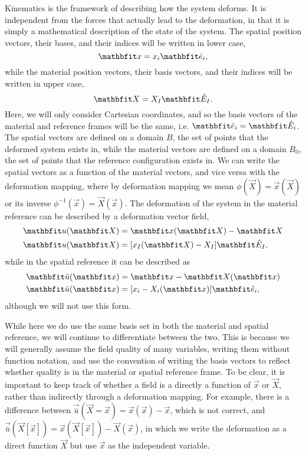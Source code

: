 Kinematics is the framework of describing how the system deforms.
It is independent from the forces that actually lead to the deformation, in that it is simply a mathematical description of the state of the system.
The spatial position vectors, their bases, and their indices will be written in lower case,
\begin{equation}
    \vec{x} = x_{i} \unitvec_{i},
\end{equation}
while the material position vectors, their basis vectors, and their indices will be written in upper case,
\begin{equation}
    \vec{X} = X_{I} \Unitvec_{I}.
\end{equation}
Here, we will only consider Cartesian coordinates, and so the basis vectors of the material and reference frames will be the same, i.e. $\unitvec_{i} = \Unitvec_{i}$.
The spatial vectors are defined on a domain $B$, the set of points that the deformed system exists in, while the material vectors are defined on a domain $B_{0}$, the set of points that the reference configuration exists in.
We can write the spatial vectors as a function of the material vectors, and vice versa with the deformation mapping, where by deformation mapping we mean $\phi(\vec{X}) = \vec{x}(\vec{X})$ or its inverse $\phi^{-1}(\vec{x}) = \vec{X}(\vec{x})$.
The deformation of the system in the material reference can be described by a deformation vector field,
\begin{align}
    \vec{u}(\vec{X}) &= \vec{x}(\vec{X}) - \vec{X} \nonumber\\
    \vec{u}(\vec{X}) &= [x_{I}(\vec{X}) - X_I] \Unitvec_{I},
\end{align}
while in the spatial reference it can be described as
\begin{align}
    \vec{\bar{u}}(\vec{x}) &= \vec{x} - \vec{X}(\vec{x}) \nonumber\\
    \vec{\bar{u}}(\vec{x}) &= [x_{i} - X_i(\vec{x})] \unitvec_{i},
\end{align}
although we will not use this form.

While here we do use the same basis set in both the material and spatial reference, we will continue to differentiate between the two.
This is because we will generally assume the field quality of many variables, writing them without function notation, and use the convention of writing the basis vectors to reflect whether quality is in the material or spatial reference frame.
To be clear, it is important to keep track of whether a field is a directly a function of $\vec{x}$ or $\vec{X}$, rather than indirectly through a deformation mapping.
For example, there is a difference between $\vec{\bar{u}}(\vec{X} = \vec{x}) = \vec{x}(\vec{x}) - \vec{x}$, which is not correct, and $\vec{\bar{u}}(\vec{X}[\vec{x}]) = \vec{x}(\vec{X}[\vec{x}]) - \vec{X}(\vec{x})$, in which we write the deformation as a direct function $\vec{X}$ but use $\vec{x}$ as the independent variable.

